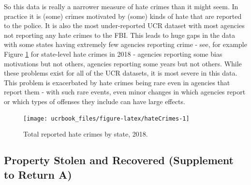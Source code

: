 \documentclass[
  12pt,
  openany]{book}
\begin{document}
So this data is really a narrower measure of hate crimes than it might seem. In practice it is (some) crimes motivated by (some) kinds of hate that are reported to the police. It is also the most under-reported UCR dataset with most agencies not reporting any hate crimes to the FBI. This leads to huge gaps in the data with some states having extremely few agencies reporting crime - see, for example Figure \ref{fig:hateCrimes} for state-level hate crimes in 2018 - agencies reporting some bias motivations but not others, agencies reporting some years but not others. While these problems exist for all of the UCR datasets, it is most severe in this data. This problem is exacerbated by hate crimes being rare even in agencies that report them - with such rare events, even minor changes in which agencies report or which types of offenses they include can have large effects.

\begin{figure}

{\centering \texttt{[image: ucrbook\_files/figure-latex/hateCrimes-1]} 

}

\caption{Total reported hate crimes by state, 2018.}\label{fig:hateCrimes}
\end{figure}

\hypertarget{property-stolen-and-recovered-supplement-to-return-a}{%
\subsection{Property Stolen and Recovered (Supplement to Return A)}\label{property-stolen-and-recovered-supplement-to-return-a}}
\end{document}
